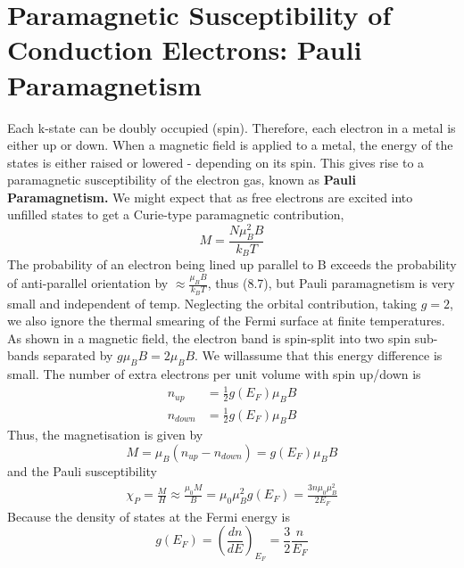 \documentclass[a4paper, 11pt, normalem]{report}
\begin{document}
\section{Paramagnetic Susceptibility of Conduction Electrons: Pauli Paramagnetism}
Each k-state can be doubly occupied (spin).
Therefore, each electron in a metal is either up or down. 
When a magnetic field is applied to a metal, the energy of the states is either raised or lowered - depending on its spin.
This gives rise to a paramagnetic susceptibility of the electron gas, known as \textbf{Pauli Paramagnetism.}
We might expect that as free electrons are excited into unfilled states to get a Curie-type paramagnetic contribution,
\begin{equation}
    M = \frac{N\mu_B^2B}{k_BT}
\end{equation}
The probability of an electron being lined up parallel to B exceeds the probability of anti-parallel orientation by $\approx \frac{\mu_BB}{k_BT}$, thus (8.7), but Pauli paramagnetism is very small and independent of temp.
Neglecting the orbital contribution, taking $g=2$, we also ignore the thermal smearing of the Fermi surface at finite temperatures. 
As shown in a magnetic field, the electron band is spin-split into two spin sub-bands separated by $g\mu_BB = 2\mu_BB$.
We willassume that this energy difference is small. 
The number of extra electrons per unit volume with spin up/down is 
\begin{align}
    n_{up} &= \frac12 g(E_F)\mu_BB \\
    n_{down} &= \frac12 g(E_F)\mu_BB
\end{align}
Thus, the magnetisation is given by
\begin{equation}
    M = \mu_B(n_{up} - n_{down}) = g(E_F)\mu_BB
\end{equation}
and the Pauli susceptibility
\begin{align}
    \chi_P = \frac{M}{H} \approx \frac{\mu_0M}{B} = \mu_0\mu_B^2g(E_F) = \frac{3n\mu_0\mu_B^2}{2E_F}
\end{align}
Because the density of states at the Fermi energy is
\begin{equation}
    g(E_F) = \left(\frac{dn}{dE}\right)_{E_F} = \frac32\frac{n}{E_F}
\end{equation}
\end{document}
